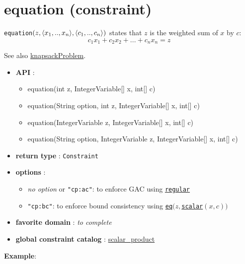 \label{equation}
\hypertarget{equation}{}

\section{equation (constraint)}\label{equation:equationconstraint}\hypertarget{equation:equationconstraint}{}
\begin{notedef}
  \texttt{equation}$(z, \langle x_1,..,x_n\rangle,\langle c_1,..,c_n\rangle)$ states that $z$ is the weighted sum of $x$ by $c$:
$$c_1x_1+c_2x_2+...+c_nx_n = z$$
\end{notedef}
See also \hyperlink{knapsackproblem:knapsackproblemconstraint}{knapsackProblem}.

\begin{itemize}
	\item \textbf{API} :
	\begin{itemize}
		\item equation(int z, IntegerVariable[] x, int[] c)
		\item equation(String option, int z, IntegerVariable[] x, int[] c)
		\item equation(IntegerVariable z, IntegerVariable[] x, int[] c)
		\item equation(String option, IntegerVariable z, IntegerVariable[] x, int[] c)
	\end{itemize}
	\item \textbf{return type} : \texttt{Constraint}
	\item \textbf{options} :
	\begin{itemize}
		\item \emph{no option} or \texttt{"cp:ac"}: to enforce GAC  using \hyperlink{regular}{\texttt{regular}}
		\item \texttt{"cp:bc"}: to enforce bound consistency using \hyperlink{eq}{\texttt{eq}}$(z,$\hyperlink{scalar}{\texttt{scalar}}$(x,c))$
	\end{itemize}
	\item \textbf{favorite domain} : \emph{to complete}
	\item \textbf{global constraint catalog} : \href{http://www.emn.fr/z-info/sdemasse/gccat/Cscalar_product.html}{scalar\_product}
\end{itemize}

\textbf{Example}:

